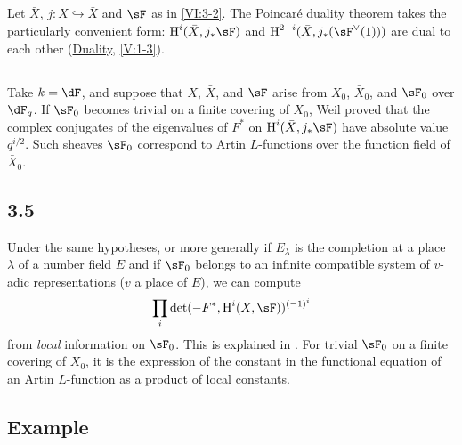 \subsection{}\label{VI:3-3}

Let $\bar X$, $j:X\hookrightarrow\bar X$ and $\sF$ as in \ref{VI:3-2}. The 
Poincaré duality theorem takes the particularly convenient form: 
$\h^i(\bar X,j_\ast \sF)$ and $\h^{2-i}(\bar X,j_\ast(\sF^\vee(1)))$ are 
dual to each other (\hyperref[V]{Duality}, \ref{V:1-3}). 





\subsection{}\label{VI:3-4}

Take $k=\dF$, and suppose that $X$, $\bar X$, and $\sF$ arise from 
$X_0$, $\bar X_0$, and $\sF_0$ over $\dF_q$. If $\sF_0$ becomes trivial on a 
finite covering of $X_0$, Weil proved that the complex conjugates of 
the eigenvalues of $F^\ast$ on $\h^i(\bar X,j_\ast\sF)$ have absolute value 
$q^{i/2}$. Such sheaves $\sF_0$ correspond to Artin $L$-functions 
over the function field of $\bar X_0$. 





\subsection*{3.5}\label{VI:3-5_} %

Under the same hypotheses, or more generally if $E_\lambda$ is the 
completion at a place $\lambda$ of a number field $E$ and if $\sF_0$ 
belongs to an infinite compatible system of $v$-adic representations 
($v$ a place of $E$), we can compute 
\[
  \prod_i \det(-F^\ast,\h^i(X,\sF))^{(-1)^i} 
\]
from \emph{local} information on $\sF_0$. This is explained in 
\cite{de73}. For trivial $\sF_0$ on a finite covering of $X_0$, it is 
the expression of the constant in the functional equation of an Artin 
$L$-function as a product of local constants. 





\subsection{Example}\label{VI:3-5}

